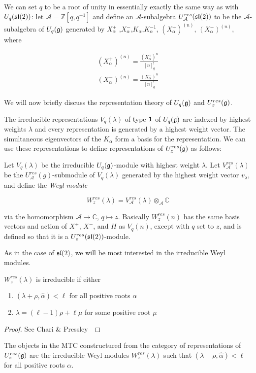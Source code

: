 We can set $q$ to be a root of unity in essentially exactly the same way as
with $U_q(\mathfrak{sl}(2))$: let $\mathcal{A} = \mathbb{Z}[q,q^{-1}]$ and define an 
$\mathcal{A}$-subalgebra $U_\mathcal{A}^{res}(\mathfrak{sl}(2))$ to be the
$\mathcal{A}$-subalgebra of $U_q(\mathfrak{g})$ generated by $ X_\alpha^+$
,$X_\alpha^-$,$K_\alpha$,$K_\alpha^{-1}$, $(X_\alpha^+) ^{(n)}$,
$(X_\alpha^-)^{(n)}$, where


\begin{align}
     (X_\alpha^+)^{(n)} = \frac{ (X_\alpha^+)^n}{[n]^!_{q}} \\
    (X_\alpha^-)^{(n)} = \frac{(X_\alpha^-)^n}{[n]^!_{q}} 
\end{align}


We will now briefly discuss the representation theory of $U_q(\mathfrak{g})$ and $U_z^{res}(\mathfrak{g})$.

The irreducible representations $V_q(\lambda)$ of type $\mathbf{1}$ of
$U_q(\mathfrak{g})$ are indexed by highest weights $\lambda$ and every representation
is generated by a highest weight vector. The simultaneous eigenvectors of the
$K_\alpha$ form a basis for the representation. We can use these
representations to define representations of $U_z^{res}(\mathfrak{g})$ as follows:

Let $V_q(\lambda)$ be the irreducible $U_q(\mathfrak{g})$-module with highest weight
$\lambda$. Let $V_\mathcal{A}^{res}(\lambda)$ be the
$U_\mathcal{A}^{res}(g)$-submodule of $V_q(\lambda)$ generated by the highest
weight vector $v_\lambda$, and define the \emph{Weyl module}

\begin{equation}
    W_z^{res}(\lambda) = V_\mathcal{A}^{res}(\lambda) \otimes_\mathcal{A} \mathbb{C}
\end{equation}

via the homomorphism $\mathcal{A} \to \mathbb{C}$, $q \mapsto z$. Basically
$W_z^{res}(n)$ has the same basis vectors and action of $X^+$, $X^-$, and $H$
as $V_q(n)$, except with $q$ set to $z$, and is defined so that it is a
$U_z^{res}(\mathfrak{sl}(2))$-module.

As in the case of $\mathfrak{sl}(2)$, we will be most interested in the irreducible Weyl
modules. 

\begin{claim}
    $W_z^{res}(\lambda)$ is irreducible if either 
    \begin{enumerate}
        \item $(\lambda + \rho, \hat{\alpha}) < \ell$ for all positive
            roots $\alpha$
        \item $\lambda = (\ell - 1) \rho + \ell \mu$ for some positive root $\mu$
    \end{enumerate}
\end{claim}
\begin{proof}
See Chari \& Pressley~\cite{CP}
\end{proof}

The objects in the MTC constructured from the category of representations of
$U_z^{res}(\mathfrak{g})$ are the irreducible Weyl modules $W_z^{res}(\lambda)$ such
that $(\lambda + \rho, \hat{\alpha}) < \ell$ for all positive roots $\alpha$.
